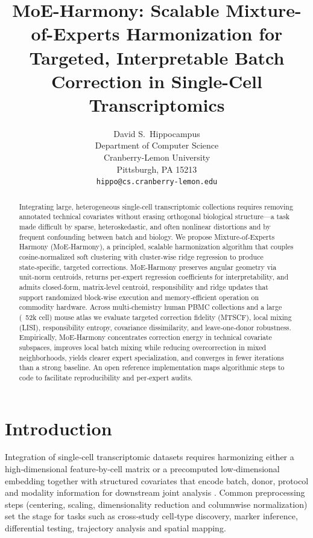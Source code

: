 \documentclass{article}
\title{MoE-Harmony: Scalable Mixture-of-Experts Harmonization for Targeted, Interpretable Batch Correction in Single-Cell Transcriptomics}
\author{%
  David S.~Hippocampus\\
  Department of Computer Science\\
  Cranberry-Lemon University\\
  Pittsburgh, PA 15213 \\
  \texttt{hippo@cs.cranberry-lemon.edu} \\
}
\begin{document}
\maketitle

\begin{abstract}
Integrating large, heterogeneous single‑cell transcriptomic collections requires removing annotated technical covariates without erasing orthogonal biological structure—a task made difficult by sparse, heteroskedastic, and often nonlinear distortions and by frequent confounding between batch and biology. We propose Mixture‑of‑Experts Harmony (MoE‑Harmony), a principled, scalable harmonization algorithm that couples cosine‑normalized soft clustering with cluster‑wise ridge regression to produce state‑specific, targeted corrections. MoE‑Harmony preserves angular geometry via unit‑norm centroids, returns per‑expert regression coefficients for interpretability, and admits closed‑form, matrix‑level centroid, responsibility and ridge updates that support randomized block‑wise execution and memory‑efficient operation on commodity hardware. Across multi‑chemistry human PBMC collections and a large (~52k cell) mouse atlas we evaluate targeted correction fidelity (MTSCF), local mixing (LISI), responsibility entropy, covariance dissimilarity, and leave‑one‑donor robustness. Empirically, MoE‑Harmony concentrates correction energy in technical covariate subspaces, improves local batch mixing while reducing overcorrection in mixed neighborhoods, yields clearer expert specialization, and converges in fewer iterations than a strong baseline. An open reference implementation maps algorithmic steps to code to facilitate reproducibility and per‑expert audits.
\end{abstract}

\section{Introduction}

Integration of single‑cell transcriptomic datasets requires harmonizing either a high‑dimensional feature‑by‑cell matrix or a precomputed low‑dimensional embedding together with structured covariates that encode batch, donor, protocol and modality information for downstream joint analysis \citep{Liu2021RobustIO,Korsunsky2019FastSA}. Common preprocessing steps (centering, scaling, dimensionality reduction and columnwise normalization) set the stage for tasks such as cross‑study cell‑type discovery, marker inference, differential testing, trajectory analysis and spatial mapping.
\end{document}
